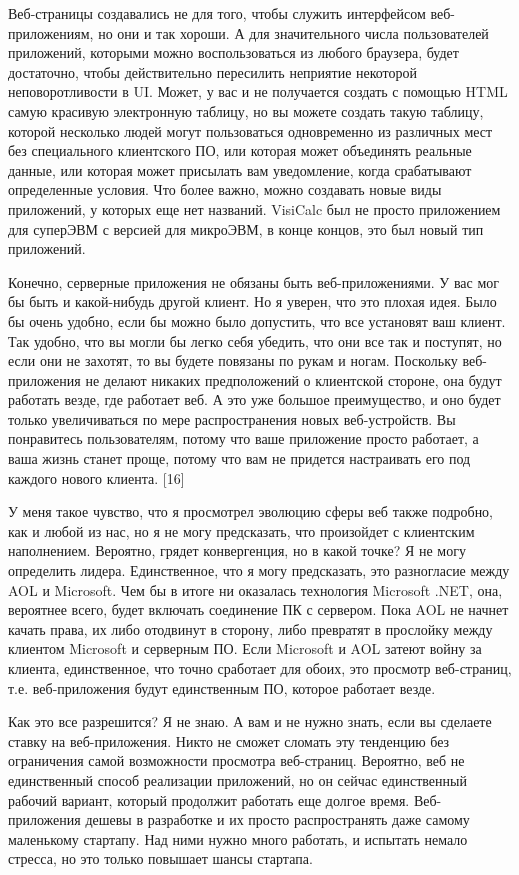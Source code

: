 \documentclass[ebook,12pt,oneside,openany]{memoir}
\begin{document}
Веб-страницы создавались не для того, чтобы служить интерфейсом
веб-приложениям, но они и так хороши. А для значительного числа
пользователей приложений, которыми можно воспользоваться из любого
браузера, будет достаточно, чтобы действительно пересилить неприятие
некоторой неповоротливости в UI. Может, у вас и не получается создать
с помощью HTML самую красивую электронную таблицу, но вы можете
создать такую таблицу, которой несколько людей могут пользоваться
одновременно из различных мест без специального клиентского ПО, или
которая может объединять реальные данные, или которая может присылать
вам уведомление, когда срабатывают определенные условия. Что более
важно, можно создавать новые виды приложений, у которых еще нет
названий. VisiCalc был не просто приложением для суперЭВМ с версией
для микроЭВМ, в конце концов, это был новый тип приложений.

Конечно, серверные приложения не обязаны быть веб-приложениями. У вас
мог бы быть и какой-нибудь другой клиент. Но я уверен, что это плохая
идея. Было бы очень удобно, если бы можно было допустить, что все
установят ваш клиент. Так удобно, что вы могли бы легко себя убедить,
что они все так и поступят, но если они не захотят, то вы будете
повязаны по рукам и ногам. Поскольку веб-приложения не делают никаких
предположений о клиентской стороне, она будут работать везде, где
работает веб. А это уже большое преимущество, и оно будет только
увеличиваться по мере распространения новых веб-устройств. Вы
понравитесь пользователям, потому что ваше приложение просто работает,
а ваша жизнь станет проще, потому что вам не придется настраивать его
под каждого нового клиента. [16]

У меня такое чувство, что я просмотрел эволюцию сферы веб также
подробно, как и любой из нас, но я не могу предсказать, что произойдет
с клиентским наполнением. Вероятно, грядет конвергенция, но в какой
точке? Я не могу определить лидера. Единственное, что я могу
предсказать, это разногласие между AOL и Microsoft. Чем бы в итоге ни
оказалась технология Microsoft .NET, она, вероятнее всего, будет
включать соединение ПК с сервером. Пока AOL не начнет качать права, их
либо отодвинут в сторону, либо превратят в прослойку между клиентом
Microsoft и серверным ПО. Если Microsoft и AOL затеют войну за
клиента, единственное, что точно сработает для обоих, это просмотр
веб-страниц, т.е. веб-приложения будут единственным ПО, которое
работает везде.

Как это все разрешится? Я не знаю. А вам и не нужно знать, если вы
сделаете ставку на веб-приложения. Никто не сможет сломать эту
тенденцию без ограничения самой возможности просмотра веб-страниц.
Вероятно, веб не единственный способ реализации приложений, но он
сейчас единственный рабочий вариант, который продолжит работать еще
долгое время. Веб-приложения дешевы в разработке и их просто
распространять даже самому маленькому стартапу. Над ними нужно много
работать, и испытать немало стресса, но это только повышает шансы
стартапа.
\end{document}
